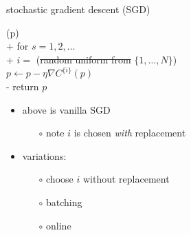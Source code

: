 \documentclass[xcolor={svgnames},
               hyperref={colorlinks,citecolor=DeepPink4,linkcolor=FireBrick,urlcolor=Maroon}]
               {beamer}
\newcommand{\grad}{\nabla}
\begin{document}
\begin{frame}{stochastic gradient descent (SGD)}


\begin{pseudo*}
(p)\text{:} \\+
    for $s = 1,2,\dots$ \\+
        $i=$ (\st{random uniform from} $\{1,\dots,N\}$) \\
        $p \gets p - \eta \grad C^{\{i\}}(p)$ \\-
    return $p$
\end{pseudo*}

\begin{itemize}
\item above is \alert{vanilla} SGD
    \begin{itemize}
    \item[$\circ$] note $i$ is chosen \emph{with} replacement
    \end{itemize}
\item variations:
    \begin{itemize}
    \item[$\circ$] choose $i$ without replacement
    \item[$\circ$] batching
    \item[$\circ$] \alert{online}
    \end{itemize}
\end{itemize}
\end{frame}
\end{document}
